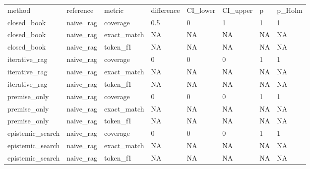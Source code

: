 \begin{tabular}{llllllll}
\hline
method & reference & metric & difference & CI\_lower & CI\_upper & p & p\_Holm \\
closed\_book & naive\_rag & coverage & 0.5 & 0 & 1 & 1 & 1 \\
closed\_book & naive\_rag & exact\_match & NA & NA & NA & NA & NA \\
closed\_book & naive\_rag & token\_f1 & NA & NA & NA & NA & NA \\
iterative\_rag & naive\_rag & coverage & 0 & 0 & 0 & 1 & 1 \\
iterative\_rag & naive\_rag & exact\_match & NA & NA & NA & NA & NA \\
iterative\_rag & naive\_rag & token\_f1 & NA & NA & NA & NA & NA \\
premise\_only & naive\_rag & coverage & 0 & 0 & 0 & 1 & 1 \\
premise\_only & naive\_rag & exact\_match & NA & NA & NA & NA & NA \\
premise\_only & naive\_rag & token\_f1 & NA & NA & NA & NA & NA \\
epistemic\_search & naive\_rag & coverage & 0 & 0 & 0 & 1 & 1 \\
epistemic\_search & naive\_rag & exact\_match & NA & NA & NA & NA & NA \\
epistemic\_search & naive\_rag & token\_f1 & NA & NA & NA & NA & NA \\
\hline
\end{tabular}
